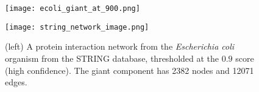 \begin{savenotes}
    \begin{figure}
        \begin{minipage}{.5\textwidth}
            \centering
            \vspace*{-6mm}
            \texttt{[image: ecoli\_giant\_at\_900.png]}
        \end{minipage}\hfill%
        \begin{minipage}{.5\textwidth}
            \centering
            \texttt{[image: string\_network\_image.png]}
            \caption[Interactions between 11 proteins visualised by the STRING database~\cite{Szklarczyk2019}.
            Edge thickness indicates the overall confidence score, i.e. the strength of data support.]%
            {(right) Protein-protein interaction network visualised\protect\footnotemark{} by the STRING database~\cite{Szklarczyk2019}.
            Edge thickness indicates the overall confidence score, i.e. the strength of data support.}
            \label{fig:string_network_image}
        \end{minipage}
        \caption{(left) A protein interaction network from the \textit{Escherichia coli} organism from the STRING database, thresholded at the $0.9$ score (high confidence). The giant component has 2382 nodes and 12071 edges.}
        \label{fig:ecoli_giant_at_900}
        \vspace{-2mm}
    \end{figure}
\end{savenotes}
